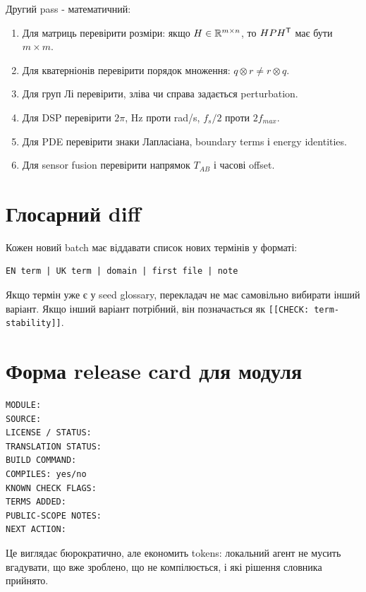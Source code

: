 Другий pass - математичний:
\begin{enumerate}[label=\arabic*.]
\item Для матриць перевірити розміри: якщо $H\in\mathbb{R}^{m\times n}$, то $HPH^{\mathsf{T}}$ має бути $m\times m$.
\item Для кватерніонів перевірити порядок множення: $q\otimes r\ne r\otimes q$.
\item Для груп Лі перевірити, зліва чи справа задається perturbation.
\item Для DSP перевірити $2\pi$, Hz проти rad/s, $f_s/2$ проти $2f_{max}$.
\item Для PDE перевірити знаки Лапласіана, boundary terms і energy identities.
\item Для sensor fusion перевірити напрямок $T_{AB}$ і часові offset.
\end{enumerate}

\section{Глосарний diff}

Кожен новий batch має віддавати список нових термінів у форматі:

\begin{lstlisting}
EN term | UK term | domain | first file | note
\end{lstlisting}

Якщо термін уже є у seed glossary, перекладач не має самовільно вибирати інший варіант. Якщо інший варіант потрібний, він позначається як \texttt{[[CHECK: term-stability]]}.

\section{Форма release card для модуля}

\begin{lstlisting}
MODULE:
SOURCE:
LICENSE / STATUS:
TRANSLATION STATUS:
BUILD COMMAND:
COMPILES: yes/no
KNOWN CHECK FLAGS:
TERMS ADDED:
PUBLIC-SCOPE NOTES:
NEXT ACTION:
\end{lstlisting}

Це виглядає бюрократично, але економить tokens: локальний агент не мусить вгадувати, що вже зроблено, що не компілюється, і які рішення словника прийнято.
